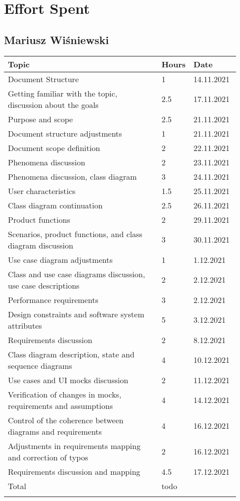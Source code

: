 \chapter{Effort Spent}

\section*{Mariusz Wiśniewski}
\begin{longtable}{@{}p{0.67\linewidth} p{0.06\linewidth} p{0.20\linewidth}@{}}
    \Xhline{1.5pt}
    Topic & Hours & Date\\ \hline
    Document Structure & 1 & 14.11.2021\\ 
    Getting familiar with the topic, discussion about the goals & 2.5 & 17.11.2021\\ 
    Purpose and scope & 2.5 & 21.11.2021\\ 
    Document structure adjustments & 1 & 21.11.2021\\
    Document scope definition & 2 & 22.11.2021\\
    Phenomena discussion & 2 & 23.11.2021\\
    Phenomena discussion, class diagram & 3 & 24.11.2021\\ 
    User characteristics & 1.5 & 25.11.2021\\ 
    Class diagram continuation & 2.5 & 26.11.2021 \\ 
    Product functions & 2 & 29.11.2021 \\
    Scenarios, product functions, and class diagram discussion & 3 & 30.11.2021\\
    Use case diagram adjustments & 1 & 1.12.2021\\
    Class and use case diagrams discussion, use case descriptions & 2 & 2.12.2021\\ 
    Performance requirements & 3 & 2.12.2021\\
    Design constraints and software system attributes & 5 & 3.12.2021\\
    Requirements discussion & 2 & 8.12.2021\\
    Class diagram description, state and sequence diagrams & 4 & 10.12.2021\\ 
    Use cases and UI mocks discussion & 2 & 11.12.2021\\
    Verification of changes in mocks, requirements and assumptions & 4 & 14.12.2021\\
    Control of the coherence between diagrams and requirements & 4 & 16.12.2021\\
    Adjustments in requirements mapping and correction of typos & 2 & 16.12.2021\\
    Requirements discussion and mapping & 4.5 & 17.12.2021\\
    \hline
    Total & todo &\\ \Xhline{1.5pt}
\end{longtable}

